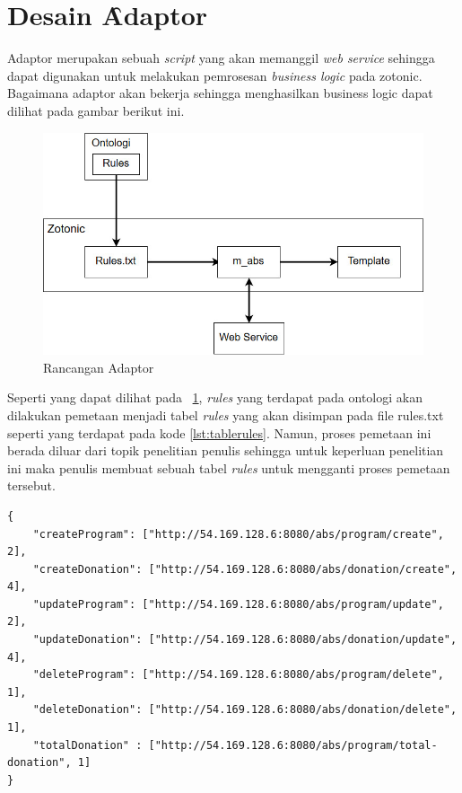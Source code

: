 \section{Desain \f{Adaptor}}

Adaptor merupakan sebuah \textit{script} yang akan memanggil \textit{web service} sehingga dapat digunakan untuk melakukan pemrosesan \textit{business logic} pada zotonic. Bagaimana adaptor akan bekerja sehingga menghasilkan business logic dapat dilihat pada gambar berikut ini.

\begin{figure}
	\centering
	\includegraphics[width=1\textwidth]
		{pics/adaptor.jpg}
	\caption{Rancangan Adaptor}
	\label{fig:adaptor}
\end{figure}
\vspace{-0.3cm}

Seperti yang dapat dilihat pada \pic~\ref{fig:adaptor}, \textit{rules} yang terdapat pada ontologi akan dilakukan pemetaan menjadi tabel \textit{rules} yang akan disimpan pada file rules.txt seperti yang terdapat pada kode \ref{lst:tablerules}. Namun, proses pemetaan ini berada diluar dari topik penelitian penulis sehingga untuk keperluan penelitian ini maka penulis membuat sebuah tabel \textit{rules} untuk mengganti proses pemetaan tersebut.

\begin{minipage}{\linewidth}
\begin{lstlisting}[caption={Contoh tabel \textit{rules}},label={lst:tablerules}]
{
	"createProgram": ["http://54.169.128.6:8080/abs/program/create", 2],
	"createDonation": ["http://54.169.128.6:8080/abs/donation/create", 4],
	"updateProgram": ["http://54.169.128.6:8080/abs/program/update", 2],
	"updateDonation": ["http://54.169.128.6:8080/abs/donation/update", 4],
	"deleteProgram": ["http://54.169.128.6:8080/abs/program/delete", 1],
	"deleteDonation": ["http://54.169.128.6:8080/abs/donation/delete", 1],
	"totalDonation" : ["http://54.169.128.6:8080/abs/program/total-donation", 1]
}
\end{lstlisting}
\end{minipage} \\

